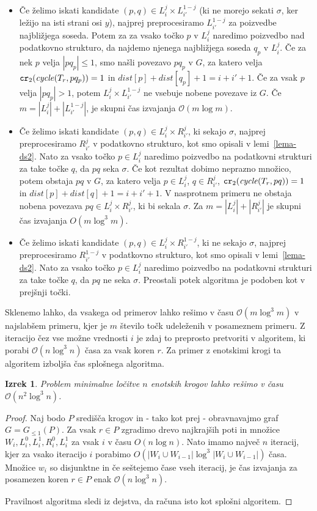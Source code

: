 \documentclass[a4paper, 12pt]{book}
\newcommand{\GG}{\ensuremath{G_{\le 1}}}
\newcommand{\OO}{\ensuremath{\mathcal{O}}} %
\newtheorem{izrek}{Izrek}[chapter]
\def\dist{\mathit{dist}}
\newcommand{\cycle}{\mathit{cycle}}
\newcommand\CR{\mbox{\tt cr}_2}		  %
\begin{document}
\begin{itemize}
\item Če želimo iskati kandidate $(p,q)\in L_i^j\times L_{i'}^{1-j}$ (ki ne morejo sekati $\sigma$, ker ležijo na isti strani osi $y$), najprej preprocesiramo $L_{i'}^{1-j}$ za poizvedbe najbližjega soseda. Potem za za vsako točko $p$ v $L_i^j$ naredimo poizvedbo nad podatkovno strukturo, da najdemo njenega najbližjega soseda $q_p$ v $L_i^j$. Če za nek $p$ velja $|pq_p|\le 1$, smo našli povezavo $pq_p$ v $G$, za katero velja $\CR(\cycle(T_r,pq_p))=1$ in $\dist[p]+\dist[q_p]+1=i+i'+1$. Če za vsak $p$ velja $|pq_p|> 1$, potem $L_i^j\times L_{i'}^{1-j}$ ne vsebuje nobene povezave iz $G$. Če $m=|L_i^j|+|L_{i'}^{1-j}|$, je skupni čas izvajanja $\OO(m\log m)$.
\item Če želimo iskati kandidate $(p,q)\in L_i^j\times R_{i'}^{j}$, ki sekajo $\sigma$, najprej preprocesiramo $R_{i'}^{j}$ v podatkovno strukturo, kot smo opisali v lemi~\ref{lema-ds2}. Nato za vsako točko $p\in L_i^j$ naredimo poizvedbo na podatkovni strukturi za take točke $q$, da $pq$ seka $\sigma$. Če kot rezultat dobimo neprazno množico, potem obstaja $pq$ v $G$, za katero velja $p\in L_i^j$, $q\in R_{i'}^{j}$, $\CR(\cycle(T_r,pq))=1$ in $\dist[p]+\dist[q]+1=i+i'+1$. V nasprotnem primeru ne obstaja nobena povezava $pq\in L_i^j\times R_{i'}^{j}$, ki bi sekala $\sigma$. Za $m=|L_i^j|+|R_{i'}^{j}|$ je skupni čas izvajanja  $O(m\log^3 m)$.
\item Če želimo iskati kandidate $(p,q)\in L_i^j\times R_{i'}^{1-j}$, ki ne sekajo $\sigma$, najprej preprocesiramo $R_{i'}^{1-j}$ v podatkovno strukturo, kot smo opisali v lemi~\ref{lema-ds2}. Nato za vsako točko $p\in L_i^j$ naredimo poizvedbo na podatkovni strukturi za take točke $q$, da $pq$ ne seka $\sigma$. Preostali potek algoritma je podoben kot v prejšnji točki. 
\end{itemize}
Sklenemo lahko, da vsakega od primerov lahko rešimo v času $\OO(m\log^3m)$ v najslabšem primeru, kjer je $m$ število točk udeleženih v posameznem primeru. Z iteracijo čez vse možne vrednosti $i$ je zdaj to preprosto pretvoriti v algoritem, ki porabi $\OO(n\log^3n)$ časa za vsak koren $r$. Za primer z enotskimi krogi ta algoritem izboljša čas splošnega algoritma. 
\begin{izrek}
\label{lema4}
Problem minimalne ločitve $n$ enotskih krogov lahko rešimo v času $\OO(n^2\log^3n)$.
\end{izrek}

\begin{proof}
Naj bodo $P$ središča krogov in - tako kot prej - obravnavajmo graf $G=\GG(P)$. Za vsak $r\in P$ zgradimo drevo najkrajših poti in množice $W_i,L_i^0,L_i^1,R_i^0,L_i^1$ za vsak $i$ v času $O(n\log n)$. Nato imamo največ $n$ iteracij, kjer za vsako iteracijo $i$ porabimo $O(|W_i\cup W_{i-1}|\log^3 |W_i\cup W_{i-1}|)$ časa. Množice $w_i$ so disjunktne in če seštejemo čase vseh iteracij, je čas izvajanja za posamezen koren $r\in P$ enak $\OO(n\log^3n)$.

Pravilnost algoritma sledi iz dejstva, da računa isto kot splošni algoritem.
\end{proof}
\end{document}
